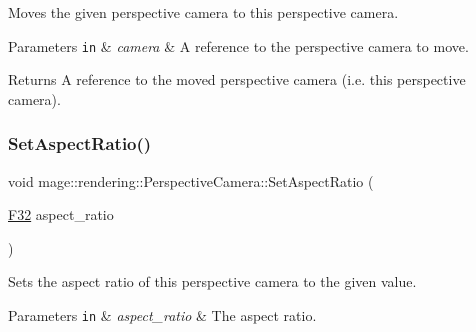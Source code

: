 Moves the given perspective camera to this perspective camera.


\begin{DoxyParams}[1]{Parameters}
\mbox{\tt in}  & {\em camera} & A reference to the perspective camera to move. \\
\hline
\end{DoxyParams}
\begin{DoxyReturn}{Returns}
A reference to the moved perspective camera (i.\+e. this perspective camera). 
\end{DoxyReturn}
\hypertarget{classmage_1_1rendering_1_1_perspective_camera_a180f74e8b39609aee8dcc2741a74076f}{}\label{classmage_1_1rendering_1_1_perspective_camera_a180f74e8b39609aee8dcc2741a74076f} 
\subsubsection{\texorpdfstring{Set\+Aspect\+Ratio()}{SetAspectRatio()}\hspace{0.1cm}{\footnotesize\ttfamily [1/2]}}
{\footnotesize\ttfamily void mage\+::rendering\+::\+Perspective\+Camera\+::\+Set\+Aspect\+Ratio (\begin{DoxyParamCaption}\item[{\hyperlink{namespacemage_aa97e833b45f06d60a0a9c4fc22ae02c0}{F32}}]{aspect\+\_\+ratio }\end{DoxyParamCaption})\hspace{0.3cm}{\ttfamily [noexcept]}}

Sets the aspect ratio of this perspective camera to the given value.


\begin{DoxyParams}[1]{Parameters}
\mbox{\tt in}  & {\em aspect\+\_\+ratio} & The aspect ratio. \\
\hline
\end{DoxyParams}
\hypertarget{classmage_1_1rendering_1_1_perspective_camera_a09a93f5281723ec6ccf1adf636619e60}{}\label{classmage_1_1rendering_1_1_perspective_camera_a09a93f5281723ec6ccf1adf636619e60} 
